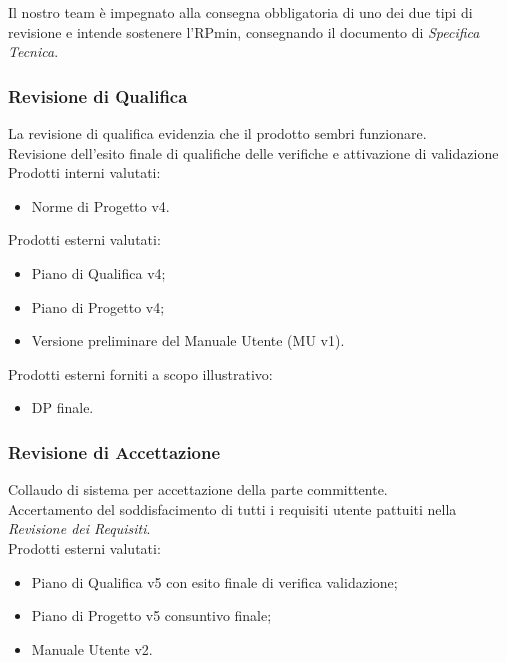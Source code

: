 \documentclass[12pt,a4paper,titlepage]{article}
\begin{document}
	Il nostro team è impegnato alla consegna obbligatoria di uno dei due tipi di revisione e intende sostenere l'RPmin, consegnando il documento di \textit{Specifica Tecnica}.
	
	\subsubsection{Revisione di Qualifica}
	La revisione di qualifica evidenzia che il prodotto sembri funzionare. \\
	Revisione dell'esito finale di qualifiche delle verifiche e attivazione di validazione \\
	Prodotti interni valutati:
	\begin{itemize}
		\item Norme di Progetto v4.
	\end{itemize}
	Prodotti esterni valutati:
	\begin{itemize}
		\item Piano di Qualifica v4;
		\item Piano di Progetto v4;
		\item Versione preliminare del Manuale Utente (MU v1).
	\end{itemize}
	Prodotti esterni forniti a scopo illustrativo:
	\begin{itemize}
		\item DP finale.
	\end{itemize}
	
	\subsubsection{Revisione di Accettazione}
	Collaudo di sistema per accettazione della parte committente.\\
	Accertamento del soddisfacimento di tutti i requisiti utente pattuiti nella \textit{Revisione dei Requisiti}.\\
	Prodotti esterni valutati:
	\begin{itemize}
		\item Piano di Qualifica v5 con esito finale di verifica validazione;
		\item Piano di Progetto v5 consuntivo finale;
		\item Manuale Utente v2.
	\end{itemize}
	
	\newpage
	
\end{document}
